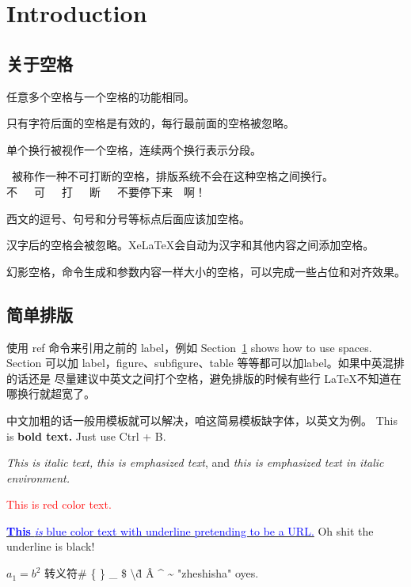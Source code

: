 \chapter{Introduction}\label{sec:1}
\section{关于空格}\label{空格} %

任意多个空格与一个空格的功能相同。

只有字符后面的空格是有效的，每行最前面的空格被忽略。

单个换行被视作一个空格，连续两个换行表示分段。

~被称作一种不可打断的空格，排版系统不会在这种空格之间换行。不~~~可~~~打~~~断~~~不要停下来~~啊！

西文的逗号、句号和分号等标点后面应该加空格。

汉字后的空格会被忽略。XeLaTeX会自动为汉字和其他内容之间添加空格。

幻影空格，命令\phantom{参数}生成和参数内容一样大小的空格，可以完成一些占位和对齐效果。

\section{简单排版}
使用 ref 命令来引用之前的 label，例如 Section~\ref{sec:1} shows how to use spaces.
Section 可以加 label，figure、subfigure、table 等等都可以加label。如果中英混排的话还是
尽量建议中英文之间打个空格，避免排版的时候有些行 \LaTeX 不知道在哪换行就超宽了。

中文加粗的话一般用模板就可以解决，咱这简易模板缺字体，以英文为例。
This is \textbf{bold text.} Just use Ctrl + B.

\textit{This is italic text,} \emph{this is emphasized text},
and \textit{this is \emph{emphasized text} in italic environment.}

\textcolor{red}{This is red color text.} %

\underline{\textcolor{blue}{\textbf{This} \textit{is} blue color text with underline 
pretending to be a URL.}} Oh shit the underline is black!

$a_1=b^2$
转义符\# \{ \} \_ \$ \textbackslash \~{d} \^{A} \^{} \~{}
"zheshisha"\cite{han2019three} oyes.

